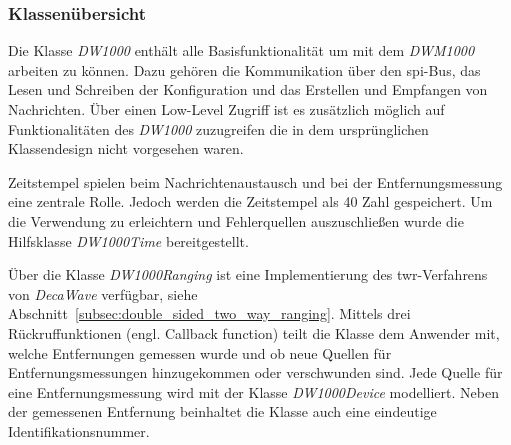 

%
%
\subsubsection{Klassenübersicht}

Die Klasse \textit{DW1000} enthält alle Basisfunktionalität um mit dem \textit{DWM1000} arbeiten zu können. Dazu gehören die Kommunikation über den \Gls{spi}-Bus, das Lesen und Schreiben der Konfiguration und das Erstellen und Empfangen von Nachrichten. Über einen Low-Level Zugriff ist es zusätzlich möglich auf Funktionalitäten des \textit{DW1000} zuzugreifen die in dem ursprünglichen Klassendesign nicht vorgesehen waren.

Zeitstempel spielen beim Nachrichtenaustausch und bei der Entfernungsmessung eine zentrale Rolle. Jedoch werden die Zeitstempel als \SI{40}{\bit} Zahl gespeichert. Um die Verwendung zu erleichtern und Fehlerquellen auszuschließen wurde die Hilfsklasse \textit{DW1000Time} bereitgestellt.

Über die Klasse \textit{DW1000Ranging} ist eine Implementierung des \Gls{twr}-Verfahrens von \textit{DecaWave} verfügbar, siehe Abschnitt~\ref{subsec:double_sided_two_way_ranging}. Mittels drei Rückruffunktionen (engl. Callback function) teilt die Klasse dem Anwender mit, welche Entfernungen gemessen wurde und ob neue Quellen für Entfernungsmessungen hinzugekommen oder verschwunden sind. Jede Quelle für eine Entfernungsmessung wird mit der Klasse \textit{DW1000Device} modelliert. Neben der gemessenen Entfernung beinhaltet die Klasse auch eine eindeutige Identifikationsnummer. 


%
%
